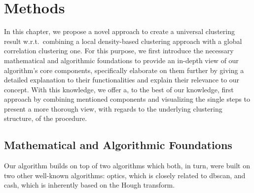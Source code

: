 \chapter{Methods}\label{ch:Methods}
In this chapter, we propose a novel approach to create a universal clustering result w.r.t.\ combining a local density-based clustering approach with a global correlation clustering one. For this purpose, we first introduce the necessary mathematical and algorithmic foundations to provide an in-depth view of our algorithm's core components, specifically elaborate on them further by giving a detailed explanation to their functionalities and explain their relevance to our concept. With this knowledge, we offer a, to the best of our knowledge, first approach by combining mentioned components and visualizing the single steps to present a more thorough view, with regards to the underlying clustering structure, of the procedure. 



\section{Mathematical and Algorithmic Foundations}
\label{sec:Foundations}
Our algorithm builds on top of two algorithms which both, in turn, were built on two other well-known algorithms: \gls{optics}, which is closely related to \gls{dbscan}, and \gls{cash}, which is inherently based on the Hough transform.

